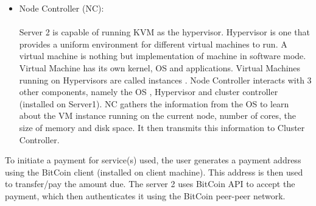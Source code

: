 \documentclass[a4page,12pt]{article}
\begin{document}
\begin{itemize}
\item Node Controller (NC):\\\\
Server 2 is capable of running KVM as the hypervisor. Hypervisor is one that provides a uniform environment for different virtual machines to run.%
A virtual machine is nothing but implementation of machine in software mode. Virtual Machine has its own kernel, OS and applications.%
Virtual Machines running on Hypervisors are called instances \cite{cloudbible}.
Node Controller interacts with 3 other components, namely the OS , Hypervisor and cluster controller (installed on Server1). NC gathers the information from the OS to learn about the VM instance running on the current node, number of cores, the size of memory and disk space. It then transmits this information to Cluster Controller.\\
\end{itemize}
To initiate a payment for service(s) used, the user generates a payment address using the BitCoin client (installed on client machine). This address is then used to transfer/pay the amount due. The server 2 uses BitCoin API to accept the payment, which then authenticates it using the BitCoin peer-peer network.\\
\end{document}
